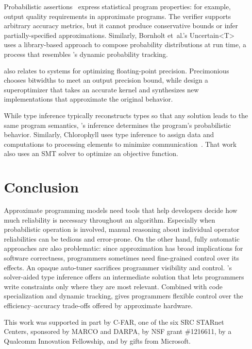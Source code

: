 \documentclass[10pt,nocopyrightspace,preprint]{sigplanconf}
\begin{document}
Probabilistic assertions~\cite{passert} express statistical program
properties: for example, output quality requirements in approximate programs.
The verifier supports arbitrary accuracy metrics, but it cannot produce
conservative bounds or infer partially-specified approximations.
Similarly, Bornholt et~al.'s \mbox{Uncertain\textless{T}\textgreater}~\cite{uncertaint} uses a library-based approach to
compose probability distributions at run time, a process that resembles \lang's
dynamic probability tracking.

\lang also relates to systems for optimizing floating-point precision.
Precimonious~\cite{precimonious} chooses bitwidths to meet an output precision
bound, while \citet{stoke-fp} design a superoptimizer that
takes an accurate kernel and
synthesizes new implementations that approximate the original
behavior.

While type inference typically reconstructs types so that any solution leads
to the same program semantics, \lang's inference determines the
program's probabilistic behavior.
Similarly,
Chlorophyll uses type inference to assign data and computations to processing
elements to minimize communication~\cite{chlorophyll}.
That work also uses an SMT solver to optimize an objective function.


\section{Conclusion}

Approximate programming models need tools that help developers decide how much
reliability is necessary throughout an algorithm.
Especially when probabilistic operation is involved, manual reasoning about
individual operator reliabilities can be tedious and error-prone.
On the other hand, fully automatic approaches are also problematic: since
approximation has broad implications for software correctness, programmers
sometimes need fine-grained control over its effects.
An opaque auto-tuner sacrifices programmer visibility and control.
\lang's solver-aided type inference offers an intermediate solution that lets programmers
write constraints only where they are most relevant.
Combined with code specialization and dynamic tracking, \lang gives
programmers flexible control over the efficiency--accuracy trade-offs offered
by approximate hardware.

\ifnum{}
\acks
This work was supported in part by C-FAR, one of the six SRC STARnet Centers,
sponsored by MARCO and DARPA, by NSF grant \#1216611, by a Qualcomm Innovation
Fellowship, and by gifts from Microsoft.
\fi
\end{document}
